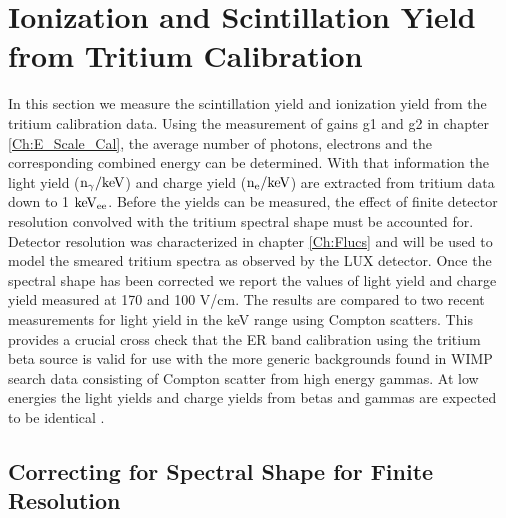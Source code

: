 \renewcommand{\thechapter}{6}

\chapter{Ionization and Scintillation Yield from Tritium Calibration}
\label{Ch:LYQY}

In this section we measure the scintillation yield and ionization yield from the tritium calibration data. Using the measurement of gains g1 and g2 in chapter \ref{Ch:E_Scale_Cal}, the average number of photons, electrons and the corresponding combined energy can be determined. With that information the light yield ($\rm n_\gamma/keV$) and charge yield ($\rm n_e/keV$) are extracted from tritium data down to 1 $\rm keV_{ee}$. Before the yields can be measured, the effect of finite detector resolution convolved with the tritium spectral shape must be accounted for. Detector resolution was characterized in chapter \ref{Ch:Flucs} and will be used to model the smeared tritium spectra as observed by the LUX detector. Once the spectral shape has been corrected we report the values of light yield and charge yield measured at 170 and 100 V/cm. The results are compared to two recent measurements for light yield in the keV range using Compton scatters. This provides a crucial cross check that the ER band calibration using the tritium beta source is valid for use with the more generic backgrounds found in WIMP search data consisting of Compton scatter from high energy gammas. At low energies the light yields and charge yields from betas and gammas are expected to be identical \cite{NEST} \cite{NEST_2013}.


\section{Correcting for Spectral Shape for Finite Resolution}
\label{sec:Smear}


